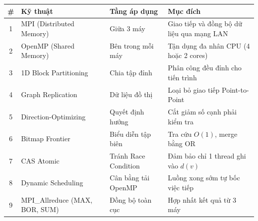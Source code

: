 \documentclass[12pt,a4paper]{article}
\begin{document}
\begin{table}[H]
\centering
\begin{tabularx}{\textwidth}{clX>{\raggedright\arraybackslash}X}
\toprule
\textbf{\#} & \textbf{Kỹ thuật} & \textbf{Tầng áp dụng} & \textbf{Mục đích} \\
\midrule
1 & MPI (Distributed Memory) & Giữa 3 máy & Giao tiếp và đồng bộ dữ liệu qua mạng LAN \\
2 & OpenMP (Shared Memory) & Bên trong mỗi máy & Tận dụng đa nhân CPU (4 hoặc 2 cores) \\
3 & 1D Block Partitioning & Chia tập đỉnh & Phân công đều đỉnh cho tiến trình \\
4 & Graph Replication & Dữ liệu đồ thị & Loại bỏ giao tiếp Point-to-Point \\
5 & Direction-Optimizing & Quyết định hướng & Cắt giảm số cạnh phải kiểm tra \\
6 & Bitmap Frontier & Biểu diễn tập biên & Tra cứu $O(1)$, merge bằng OR \\
7 & CAS Atomic & Tránh Race Condition & Đảm bảo chỉ 1 thread ghi vào $d(v)$ \\
8 & Dynamic Scheduling & Cân bằng tải OpenMP & Luồng xong sớm tự bốc việc tiếp \\
9 & MPI\_Allreduce (MAX, BOR, SUM) & Đồng bộ toàn cục & Hợp nhất kết quả từ 3 máy \\
\bottomrule
\end{tabularx}
\end{table}
\end{document}
